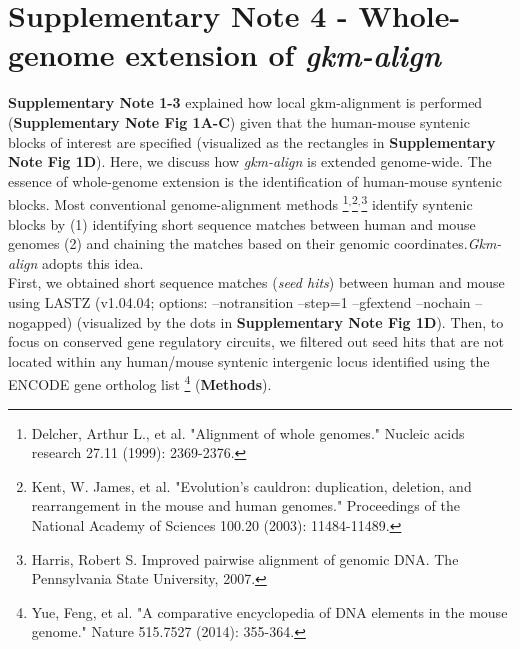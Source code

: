 \documentclass[english]{article}
\begin{document}
\section{Supplementary Note 4 - Whole-genome extension of \textit{gkm-align}}

\textbf{Supplementary Note 1-3} explained how local gkm-alignment is performed (\textbf{Supplementary Note Fig 1A-C}) given that the human-mouse syntenic blocks of interest are specified (visualized as the rectangles in \textbf{Supplementary Note Fig 1D}). Here, we discuss how \textit{gkm-align} is extended genome-wide. The essence of whole-genome extension is the identification of human-mouse syntenic blocks. Most conventional genome-alignment methods \footnote{Delcher, Arthur L., et al. "Alignment of whole genomes." Nucleic acids research 27.11 (1999): 2369-2376.}$^{,}$\footnote{Kent, W. James, et al. "Evolution's cauldron: duplication, deletion, and rearrangement in the mouse and human genomes." Proceedings of the National Academy of Sciences 100.20 (2003): 11484-11489.}$^{,}$\footnote{Harris, Robert S. Improved pairwise alignment of genomic DNA. The Pennsylvania State University, 2007.} identify syntenic blocks by (1) identifying short sequence matches between human and mouse genomes  (2) and chaining the matches based on their genomic coordinates.\textit{Gkm-align} adopts this idea. \\

First, we obtained short sequence matches (\textit{seed hits}) between human and mouse using LASTZ (v1.04.04; options: --notransition --step=1 --gfextend --nochain --nogapped) (visualized by the dots in \textbf{Supplementary Note Fig 1D}). Then, to focus on conserved gene regulatory circuits, we  filtered out seed hits that are not located within any human/mouse syntenic intergenic locus identified using the ENCODE gene ortholog list \footnote{Yue, Feng, et al. "A comparative encyclopedia of DNA elements in the mouse genome." Nature 515.7527 (2014): 355-364.} (\textbf{Methods}). \\
\end{document}
